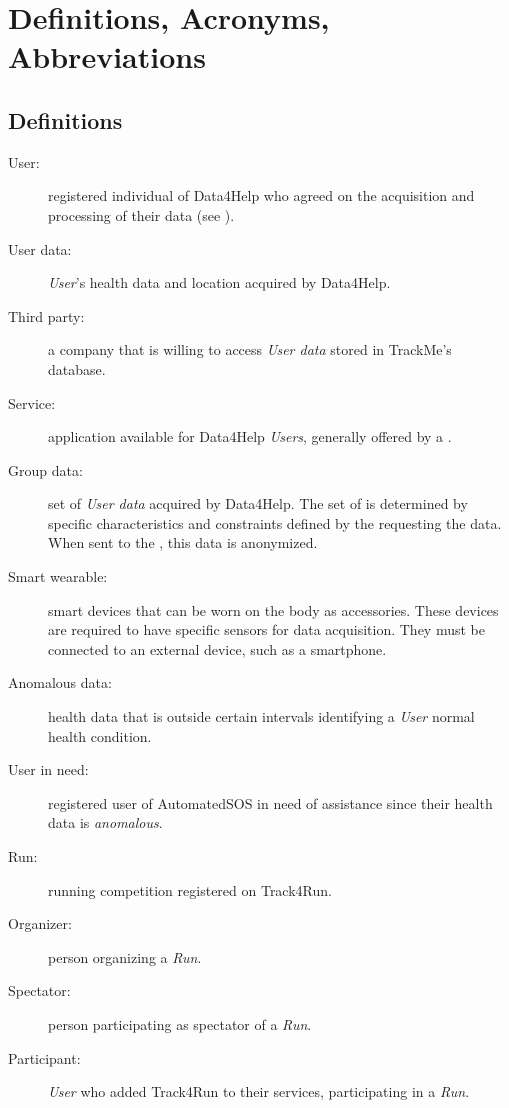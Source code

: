 \documentclass[../../DD.tex]{subfiles}
\begin{document}
\section{Definitions, Acronyms, Abbreviations}
		\subsection{Definitions}
		\begin{description}
			\item[User:]registered individual of Data4Help who agreed on the acquisition and processing of their data (see ).
			\item[User data:]\textit{User}'s health data and location acquired by Data4Help.
			\item[Third party:]a company that is willing to access \textit{User data} stored in TrackMe's database.
			\item[Service:]application available for Data4Help \textit{Users}, generally offered by a .
			\item[Group data:]set of \textit{User data} acquired by Data4Help. The set of  is determined by specific characteristics and constraints defined by the  requesting the data. When sent to the , this data is anonymized.
			\item[Smart wearable:]smart devices that can be worn on the body as accessories. These devices are required to have specific sensors for data acquisition. They must be connected to an external device, such as a smartphone.
			\item[Anomalous data:]health data that is outside certain intervals identifying a \textit{User} normal health condition.
			\item[User in need:]registered user of AutomatedSOS in need of assistance since their health data is \textit{anomalous}.
			\item[Run:]running competition registered on Track4Run. 
			\item[Organizer:]person organizing a \textit{Run}.
			\item[Spectator:]person participating as spectator of a \textit{Run}.
			\item[Participant:]\textit{User} who added Track4Run to their services, participating in a \textit{Run}.
			
			


		\end{description}
\end{document}
